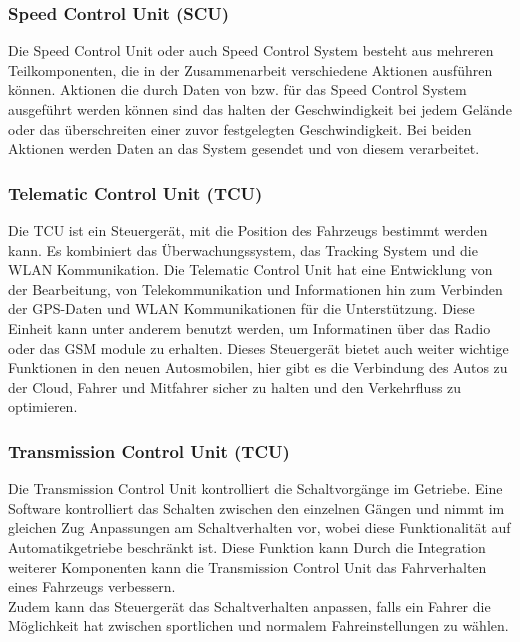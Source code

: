         \subsubsection{Speed Control Unit (SCU)}
        Die Speed Control Unit oder auch Speed Control System besteht aus mehreren Teilkomponenten, die in der Zusammenarbeit
        verschiedene Aktionen ausführen können. Aktionen die durch Daten von bzw. für das Speed Control System ausgeführt
        werden können sind das halten der Geschwindigkeit bei jedem Gelände oder das überschreiten einer zuvor festgelegten
        Geschwindigkeit. Bei beiden Aktionen werden Daten an das System gesendet und von diesem verarbeitet.
        ~\cite{SCU.PB1}

        \subsubsection{Telematic Control Unit (TCU)}
        Die TCU ist ein Steuergerät, mit die Position des Fahrzeugs bestimmt werden kann. Es kombiniert das Überwachungssystem,
        das Tracking System und die WLAN Kommunikation. Die Telematic Control Unit hat eine Entwicklung von der Bearbeitung, von
        Telekommunikation und Informationen hin zum Verbinden der GPS-Daten und WLAN Kommunikationen für die Unterstützung.
        Diese Einheit kann unter anderem benutzt werden, um Informatinen über das Radio oder das GSM module zu erhalten.
        Dieses Steuergerät bietet auch weiter wichtige Funktionen in den neuen Autosmobilen, hier gibt es die Verbindung
        des Autos zu der Cloud, Fahrer und Mitfahrer sicher zu halten und den Verkehrfluss zu optimieren.
        ~\cite{telematiccontrol.PB1} ~\cite{telematiccontrol.PB2} ~\cite{telematiccontrol.PB3}

        \subsubsection{Transmission Control Unit (TCU)}
        Die Transmission Control Unit kontrolliert die Schaltvorgänge im Getriebe. Eine Software kontrolliert das Schalten
        zwischen den einzelnen Gängen und nimmt im gleichen Zug Anpassungen am Schaltverhalten vor, wobei diese Funktionalität auf Automatikgetriebe beschränkt ist. Diese Funktion kann
        Durch die Integration weiterer Komponenten kann die Transmission Control Unit das Fahrverhalten eines Fahrzeugs verbessern.\\
        Zudem kann das Steuergerät das Schaltverhalten anpassen, falls ein Fahrer die Möglichkeit hat zwischen sportlichen und normalem Fahreinstellungen zu wählen.
        ~\cite{transmissioncontrol.PB1} ~\cite{transmissioncontrol.PB2}

